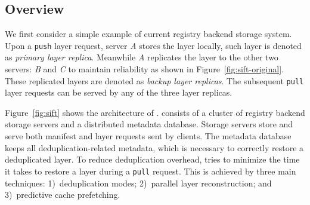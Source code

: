 \subsection{Overview}
\label{sec:overview}


%


We first consider  a simple example of current registry backend storage system.
Upon a \texttt{push} layer request,
server \emph{A} stores the layer locally, such layer is denoted as \emph{primary layer replica}.
Meanwhile \emph{A} replicates the layer to the other two servers: 
\emph{B} and \emph{C} to maintain reliability as shown in Figure~\ref{fig:sift-original}. 
These replicated layers are denoted as \emph{backup layer replicas}.
The subsequent \texttt{pull} layer requests can be served by 
any of the three layer replicas.%

Figure~\ref{fig:sift} shows the architecture of \sysname.
\sysname consists of a cluster of registry backend storage servers and a distributed metadata database. 
Storage servers store and serve both manifest and layer requests sent by clients. The
metadata database keeps all deduplication-related metadata, which is necessary to correctly restore
a deduplicated layer.
%
To reduce deduplication overhead, \sysname tries to minimize the time it takes to restore a layer
during a \texttt{pull} request. This is achieved by three main techniques: 1)~deduplication modes;
2)~parallel layer reconstruction; and 3)~predictive cache prefetching.

